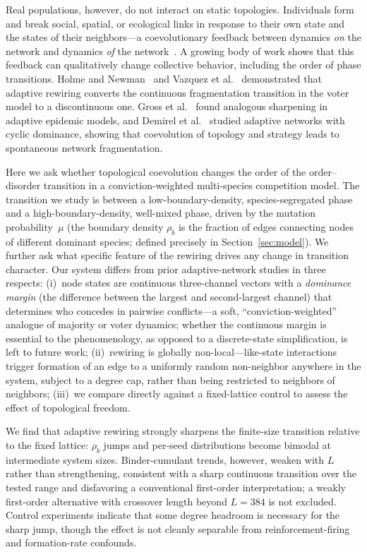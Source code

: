 \documentclass[preprint,12pt]{elsarticle}
\newcommand{\rb}{\rho_b}              %
\newcommand{\Lsys}{L}                 %
\begin{document}
Real populations, however, do not interact on static topologies.
Individuals form and break social, spatial, or ecological links
in response to their own state and the states of their
neighbors---a coevolutionary feedback between dynamics
\emph{on} the network and dynamics \emph{of} the
network~\cite{gross2008adaptive}.
A growing body of work shows that this feedback can qualitatively
change collective behavior, including the order of phase
transitions.
Holme and Newman~\cite{holme2006nonequilibrium} and
Vazquez et al.~\cite{vazquez2008generic} demonstrated that
adaptive rewiring converts the continuous fragmentation
transition in the voter model to a discontinuous one.
Gross et al.~\cite{gross2006epidemic} found analogous
sharpening in adaptive epidemic models, and
Demirel et al.~\cite{demirel2011cyclic} studied adaptive
networks with cyclic dominance, showing that coevolution
of topology and strategy leads to spontaneous
network fragmentation.

Here we ask whether topological coevolution changes the order
of the order--disorder transition in a conviction-weighted
multi-species competition model.
The transition we study is between a low-boundary-density,
species-segregated phase and a high-boundary-density, well-mixed
phase, driven by the mutation probability~$\mu$
(the boundary density $\rb$ is the fraction of edges connecting
nodes of different dominant species; defined precisely in
Section~\ref{sec:model}).
We further ask what specific feature of the rewiring drives any
change in transition character.
Our system differs from prior adaptive-network studies in three
respects:
(i)~node states are continuous three-channel vectors with a
    \emph{dominance margin} (the difference between the largest
    and second-largest channel) that determines who concedes in
    pairwise conflicts---a soft, ``conviction-weighted'' analogue
    of majority or voter dynamics; whether the continuous margin
    is essential to the phenomenology, as opposed to a
    discrete-state simplification, is left to future work;
(ii)~rewiring is globally non-local---like-state interactions
    trigger formation of an edge to a uniformly random non-neighbor
    anywhere in the system, subject to a degree cap, rather than
    being restricted to neighbors of neighbors;
(iii)~we compare directly against a fixed-lattice control to
    assess the effect of topological freedom.

We find that adaptive rewiring strongly sharpens the finite-size
transition relative to the fixed lattice: $\rb$ jumps and per-seed
distributions become bimodal at intermediate system sizes.
Binder-cumulant trends, however, weaken with $\Lsys$ rather than
strengthening, consistent with a sharp continuous transition over
the tested range and disfavoring a conventional first-order
interpretation; a weakly first-order alternative with crossover
length beyond $\Lsys = 384$ is not excluded.
Control experiments indicate that some degree headroom is
necessary for the sharp jump, though the effect is not cleanly
separable from reinforcement-firing and formation-rate confounds.
\end{document}

